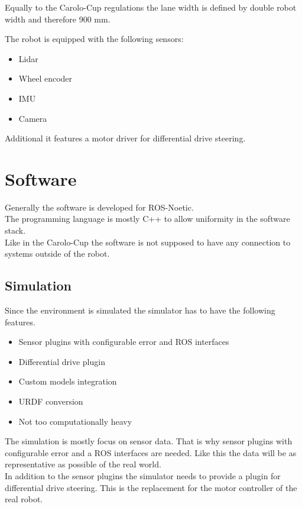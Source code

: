 Equally to the Carolo-Cup regulations the lane width is defined by double robot width and therefore 900 mm. 

The robot is equipped with the following sensors:

\begin{itemize}
	\item Lidar
	\item Wheel encoder
	\item IMU
	\item Camera
\end{itemize}

Additional it features a motor driver for differential drive steering.

\section{Software}
Generally the software is developed for ROS-Noetic.\\
The programming language is mostly C++ to allow uniformity in the software stack.\\
Like in the Carolo-Cup the software is not supposed to have any connection to systems outside of the robot.\\

\subsection{Simulation}
Since the environment is simulated the simulator has to have the following features.
\begin{itemize}
	\item Sensor plugins with configurable error and ROS interfaces
	\item Differential drive plugin
	\item Custom models integration
	\item URDF conversion
	\item Not too computationally heavy
\end{itemize}

The simulation is mostly focus on sensor data. That is why sensor plugins with configurable error and a ROS interfaces are needed. Like this the data will be as representative as possible of the real world.\\

In addition to the sensor plugins the simulator needs to provide a plugin for differential drive steering. This is the replacement for the motor controller of the real robot.\\


